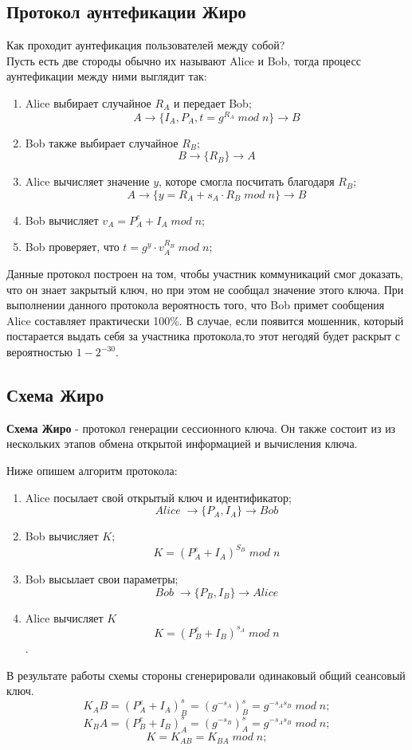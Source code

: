 \documentclass[a4paper]{article}
\begin{document}
\subsection{Протокол аунтефикации Жиро}
    Как проходит аунтефикация пользователей между собой? \\
    Пусть есть две стороды обычно их называют Alice и Bob, тогда процесс аунтефикации между ними выглядит так:
    \begin{enumerate}
        \item Alice выбирает случайное $R_A$  и передает Bob; 
        $$A \rightarrow \{I_A, P_A, t = g^{R_A} \; mod \; n\} \rightarrow B $$
        \item Bob также выбирает случайное $R_B$;
        $$B \rightarrow \{R_B\} \rightarrow A $$
        \item Alice вычисляет значение $y$, которе смогла посчитать благодаря $R_B$; $$A \rightarrow \{y = R_A + s_A \cdot R_B \; mod \; n\} \rightarrow B $$
        \item Bob вычисляет $v_A = P_A^e + I_A \; mod \; n $;
        \item Bob проверяет, что $t = g^y\cdot v_A^{R_B} \; mod \; n$;
    \end{enumerate}

    Данные протокол построен на том, чтобы участник коммуникаций смог доказать, что он знает закрытый ключ, но при этом не сообщал значение этого ключа. При выполнении данного протокола вероятность того, что Bob примет сообщения Alice составляет практически 100\%.
    В случае, если появится мошенник, который постарается выдать себя за участника протокола,то этот негодяй будет раскрыт с вероятностью $1 - 2^{-30}$.

\subsection{Схема Жиро}
\textbf{Схема Жиро} - протокол генерации сессионного ключа. Он также состоит из из нескольких этапов обмена открытой информацией и вычисления ключа.
\par Ниже опишем алгоритм протокола:
\begin{enumerate}
    \item Alice посылает свой открытый ключ и идентификатор; $$Alice \; \rightarrow \{ P_A, I_A\} \rightarrow Bob$$
    \item Bob вычисляет $K$; $$K = (P_A^e + I_A)^{S_B} \; mod \; n$$
    \item Bob высылает свои параметры; $$ Bob \; \rightarrow \{ P_B, I_B\} \rightarrow Alice $$
    \item Alice вычисляет $K$ $$K =(P_B^e + I_B)^{s_A} \; mod \; n$$.
\end{enumerate}
В результате работы схемы стороны сгенерировали одинаковый общий сеансовый ключ.
$$K_AB = (P_A^e + I_A)^s_B = (g^{-s_A})^s_B = g^{-s_As_B} \; mod \; n ;$$
$$K_BA = (P_B^e + I_B)^s_A = (g^{-s_B})^s_A = g^{-s_As_B} \; mod \; n ;$$
$$K = K_{AB} =K_{BA} \; mod \; n ;$$
\end{document}
